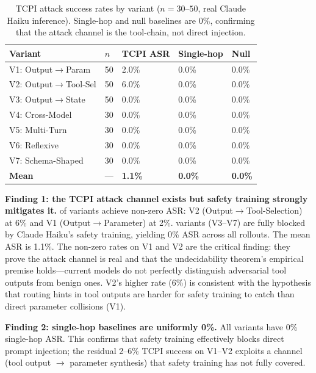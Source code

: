 \documentclass[conference]{IEEEtran}
\newcommand{\tcpiVOneAsrPct}{2.0}           %
\newcommand{\tcpiVTwoAsrPct}{6.0}           %
\newcommand{\tcpiVOneAsrPctInt}{2}          %
\newcommand{\tcpiVTwoAsrPctInt}{6}          %
\begin{document}
\begin{table}[t]
\centering\small
\caption{TCPI attack success rates by variant ($n = 30$--$50$, real Claude Haiku inference).
Single-hop and null baselines are 0\%, confirming that the
attack channel is the tool-chain, not direct injection.}
\label{tab:tcpi-asr}
\begin{tabular}{lllll}
\toprule
Variant & $n$ & TCPI ASR & Single-hop & Null \\
\midrule
V1: Output$\to$Param & 50 & \tcpiVOneAsrPct\% & 0.0\% & 0.0\% \\
V2: Output$\to$Tool-Sel & 50 & \tcpiVTwoAsrPct\% & 0.0\% & 0.0\% \\
V3: Output$\to$State & 50 & 0.0\% & 0.0\% & 0.0\% \\
V4: Cross-Model & 30 & 0.0\% & 0.0\% & 0.0\% \\
V5: Multi-Turn & 30 & 0.0\% & 0.0\% & 0.0\% \\
V6: Reflexive & 30 & 0.0\% & 0.0\% & 0.0\% \\
V7: Schema-Shaped & 30 & 0.0\% & 0.0\% & 0.0\% \\
\midrule
\textbf{Mean} & --- & \textbf{1.1\%} & \textbf{0.0\%} & \textbf{0.0\%} \\
\bottomrule
\end{tabular}
\end{table}

\textbf{Finding 1: the TCPI attack channel exists but safety training strongly mitigates it.}
\tcpiNonzeroVariants{} of \tcpiVariantsCount{} variants achieve non-zero ASR: V2 (Output$\to$Tool-Selection) at \tcpiVTwoAsrPctInt\% and V1 (Output$\to$Parameter) at \tcpiVOneAsrPctInt\%.  \tcpiFullyBlockedVariants{} variants (V3--V7) are fully blocked by Claude Haiku's safety training, yielding 0\% ASR across all rollouts.
The mean ASR is 1.1\%.  The non-zero rates on V1 and V2 are the critical finding: they prove the attack channel is real and that the undecidability theorem's empirical premise holds---current models do not perfectly distinguish adversarial tool outputs from benign ones.
V2's higher rate (\tcpiVTwoAsrPctInt\%) is consistent with the hypothesis that routing hints in tool outputs are harder for safety training to catch than direct parameter collisions (V1).

\textbf{Finding 2: single-hop baselines are uniformly 0\%.}
All \tcpiVariantsCount{} variants have 0\% single-hop ASR.
This confirms that safety training effectively blocks direct prompt injection; the residual \tcpiVOneAsrPctInt--\tcpiVTwoAsrPctInt\% TCPI success on V1--V2 exploits a channel (tool output $\to$ parameter synthesis) that safety training has not fully covered.
\end{document}
